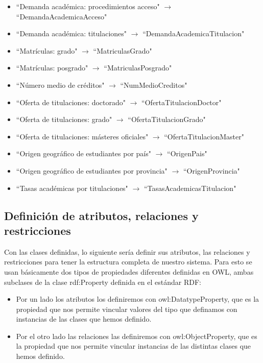 \begin{itemize}
	\item ``Demanda académica: procedimientos acceso"  $\rightarrow$  ``DemandaAcademicaAcceso"
	\item ``Demanda académica: titulaciones"  $\rightarrow$  ``DemandaAcademicaTitulacion"
	\item ``Matrículas: grado"  $\rightarrow$  ``MatriculasGrado"
	\item ``Matrículas: posgrado"  $\rightarrow$  ``MatriculasPosgrado"
	\item ``Número medio de créditos"  $\rightarrow$  ``NumMedioCreditos"
	\item ``Oferta de titulaciones: doctorado"  $\rightarrow$  ``OfertaTitulacionDoctor"
	\item ``Oferta de titulaciones: grado"  $\rightarrow$  ``OfertaTitulacionGrado"
	\item ``Oferta de titulaciones: másteres oficiales"  $\rightarrow$  ``OfertaTitulacionMaster"
	\item ``Origen geográfico de estudiantes por país"  $\rightarrow$  ``OrigenPais"
	\item ``Origen geográfico de estudiantes por provincia"  $\rightarrow$  ``OrigenProvincia"
	\item ``Tasas académicas por titulaciones"  $\rightarrow$  ``TasasAcademicasTitulacion"
\end{itemize}

\subsection{Definición de atributos, relaciones y restricciones}

Con las clases definidas, lo siguiente sería definir sus atributos, las relaciones y restricciones para tener la estructura completa de nuestro sistema. Para esto se usan básicamente dos tipos de propiedades diferentes definidas en OWL, ambas subclases de la clase rdf:Property definida en el estándar RDF:

\begin{itemize}
	\item Por un lado los atributos los definiremos con owl:DatatypeProperty, que es la propiedad que nos permite vincular valores del tipo que definamos con instancias de las clases que hemos definido.
	\item Por el otro lado las relaciones las definiremos con owl:ObjectProperty, que es la propiedad que nos permite vincular instancias de las distintas clases que hemos definido.
\end{itemize}
 
